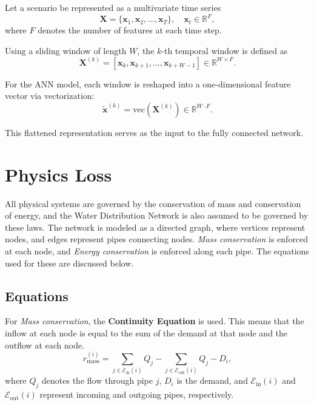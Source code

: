 \documentclass[final,5p,times,twocolumn,authoryear]{elsarticle}
\begin{document}
Let a scenario be represented as a multivariate time series
\begin{equation}
\mathbf{X} = \{\mathbf{x}_1, \mathbf{x}_2, \dots, \mathbf{x}_T\},
\quad
\mathbf{x}_t \in \mathbb{R}^{F},
\end{equation}
where $F$ denotes the number of features at each time step.

Using a sliding window of length $W$, the $k$-th temporal window is defined as
\begin{equation}
\mathbf{X}^{(k)} =
\left[
\mathbf{x}_{k},
\mathbf{x}_{k+1},
\dots,
\mathbf{x}_{k+W-1}
\right]
\in \mathbb{R}^{W \times F}.
\end{equation}

For the ANN model, each window is reshaped into a one-dimensional feature vector via vectorization:
\begin{equation}
\tilde{\mathbf{x}}^{(k)} =
\mathrm{vec}\left(\mathbf{X}^{(k)}\right)
\in \mathbb{R}^{W \cdot F}.
\end{equation}

This flattened representation serves as the input to the fully connected network.

\section{Physics Loss}
All physical systems are governed by the conservation of mass and conservation of energy, and the Water Distribution Network is also assumed to be governed by these laws. The network is modeled as a directed graph, where vertices represent nodes, and edges represent pipes connecting nodes. \textit{Mass conservation} is enforced at each node, and \textit{Energy conservation} is enforced along each pipe. The equations used for these are discussed below.

\subsection{Equations}
For \textit{Mass conservation}, the \textbf{Continuity Equation} is used. This means that the inflow at each node is equal to the sum of the demand at that node and the outflow at each node.
\[
r^{(i)}_{\mathrm{mass}}
=
\sum_{j \in \mathcal{E}_{\mathrm{in}}(i)} Q_j
-
\sum_{j \in \mathcal{E}_{\mathrm{out}}(i)} Q_j
-
D_i,
\]
where $Q_j$ denotes the flow through pipe $j$, $D_i$ is the demand, and $\mathcal{E}_{\mathrm{in}}(i)$ and $\mathcal{E}_{\mathrm{out}}(i)$ represent incoming and outgoing pipes, respectively.
\end{document}
